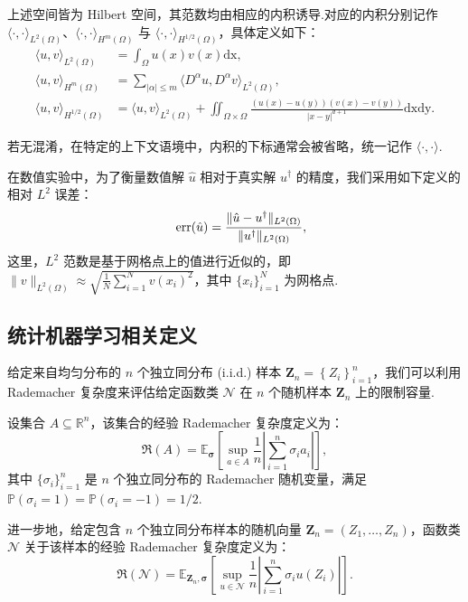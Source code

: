 \begin{definition}[范数与内积]
上述空间皆为 Hilbert 空间，其范数均由相应的内积诱导.对应的内积分别记作 $\langle \cdot, \cdot \rangle_{L^2(\Omega)}$、$\langle \cdot, \cdot \rangle_{H^m(\Omega)}$ 与 $\langle \cdot, \cdot \rangle_{H^{1/2}(\Omega)}$，具体定义如下：
\begin{align*}
\langle u, v \rangle_{L^2(\Omega)} &= \int_{\Omega} u(x)v(x) \text{dx}, \\
\langle u, v \rangle_{H^m(\Omega)} &= \sum_{|\alpha| \le m} \langle D^\alpha u, D^\alpha v \rangle_{L^2(\Omega)}, \\
\langle u, v \rangle_{H^{1/2}(\Omega)} &= \langle u, v \rangle_{L^2(\Omega)} + \iint_{\Omega \times \Omega} \frac{(u(x) - u(y))(v(x) - v(y))}{|x - y|^{d+1}}  \text{dxdy}.
\end{align*}

若无混淆，在特定的上下文语境中，内积的下标通常会被省略，统一记作 $\langle \cdot, \cdot \rangle$.
\end{definition}

\begin{definition}[$L^{2}$ 误差]
在数值实验中，为了衡量数值解 $\hat{u}$ 相对于真实解 $u^{\dagger}$ 的精度，我们采用如下定义的相对 $L^{2}$ 误差：
\begin{equation*}
\quad\operatorname{err}(\hat{u})=\frac{\|\hat{u}-u^{\dagger}\|_{L^{2}(\Omega)}}{\|u^{\dagger}\|_{L^{2}(\Omega)}},
\end{equation*}
这里，$L^2$ 范数是基于网格点上的值进行近似的，即 $\|v\|_{L^{2}(\Omega)}\approx\sqrt{\frac{1}{N}\sum_{i=1}^{N}v(x_{i})^{2}}$，其中 $\{x_{i}\}_{i=1}^{N}$ 为网格点.
\end{definition}

\subsection{统计机器学习相关定义}
给定来自均匀分布的 $n$ 个独立同分布 (i.i.d.) 样本 $\mathbf{Z}_{n}=\left\{Z_{i}\right\}_{i=1}^{n}$，我们可以利用 Rademacher 复杂度来评估给定函数类 $\mathcal{N}$ 在 $n$ 个随机样本 $\mathbf{Z}_{n}$ 上的限制容量.
\begin{definition}\label{def:staerr:radcom}
设集合 $A \subseteq \mathbb{R}^{n}$，该{\heiti 集合}的经验 Rademacher 复杂度定义为：
$$\mathfrak{R}(A)=\mathbb{E}_{\mathbf{\sigma}}\left[\sup _{a \in A} \frac{1}{n}\left|\sum_{i=1}^{n} \sigma_{i} a_{i}\right|\right],$$
其中 $\{\sigma_{i}\}_{i=1}^{n}$ 是 $n$ 个独立同分布的 Rademacher 随机变量，满足 $\mathbb{P}(\sigma_{i}=1)=\mathbb{P}(\sigma_{i}=-1)=1/2$.

进一步地，给定包含 $n$ 个独立同分布样本的随机向量 $\mathbf{Z}_{n}=(Z_1, \dots, Z_n)$，{\heiti 函数类} $\mathcal{N}$ 关于该样本的经验 Rademacher 复杂度定义为：
$$\mathfrak{R}(\mathcal{N})=\mathbb{E}_{\mathbf{Z}_{n}, \mathbf{\sigma}}\left[\sup _{u \in \mathcal{N}} \frac{1}{n} \left| \sum_{i=1}^{n} \sigma_{i} u(Z_{i}) \right|\right].$$
\end{definition}

